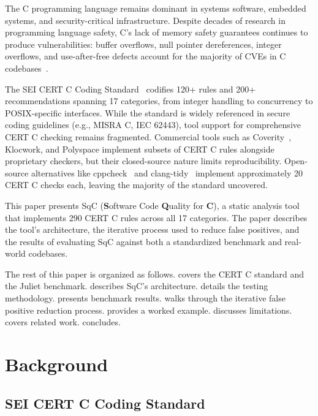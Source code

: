 \documentclass[10pt,twocolumn,letterpaper]{article}
\begin{document}
The C programming language remains dominant in systems software,
embedded systems, and security-critical infrastructure.  Despite decades
of research in programming language safety, C's lack of memory safety
guarantees continues to produce vulnerabilities: buffer overflows, null
pointer dereferences, integer overflows, and use-after-free defects
account for the majority of CVEs in C codebases~\cite{cwe-top25}.

The SEI CERT C Coding Standard~\cite{cert-c} codifies 120+ rules and
200+ recommendations spanning 17 categories, from integer handling to
concurrency to POSIX-specific interfaces.  While the standard is widely
referenced in secure coding guidelines (e.g., MISRA C, IEC 62443),
tool support for comprehensive CERT C checking remains fragmented.
Commercial tools such as Coverity~\cite{coverity}, Klocwork, and
Polyspace implement subsets of CERT C rules alongside proprietary
checkers, but their closed-source nature limits reproducibility.
Open-source alternatives like cppcheck~\cite{cppcheck} and
clang-tidy~\cite{clang-tidy} implement approximately 20 CERT C checks
each, leaving the majority of the standard uncovered.

This paper presents SqC (\textbf{S}oftware Code \textbf{Q}uality for
\textbf{C}), a static analysis tool that implements 290 CERT C rules
across all 17 categories.  The paper describes the tool's architecture,
the iterative process used to reduce false positives, and the results of
evaluating SqC against both a standardized benchmark and real-world
codebases.

The rest of this paper is organized as follows.  
covers the CERT C standard and the Juliet benchmark.
 describes SqC's architecture.
 details the testing methodology.
 presents benchmark results.
 walks through the iterative false positive
reduction process.   provides a worked
example.   discusses limitations.
 covers related work.  
concludes.

\section{Background}
\label{sec:background}

\subsection{SEI CERT C Coding Standard}
\end{document}
